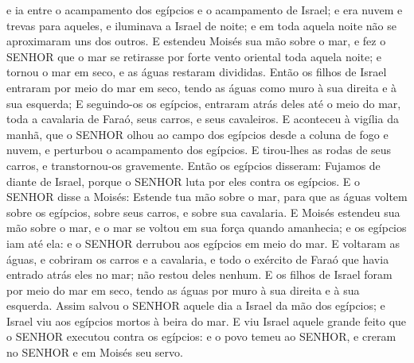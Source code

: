 {e ia entre o acampamento dos egípcios e o acampamento de Israel; e era nuvem e trevas para aqueles, e iluminava a Israel de noite; e em toda aquela noite não se aproximaram uns dos outros.
E estendeu Moisés sua mão sobre o mar, e fez o SENHOR que o mar se retirasse por forte vento oriental toda aquela noite; e tornou o mar em seco, e as águas restaram divididas.
Então os filhos de Israel entraram por meio do mar em seco, tendo as águas como muro à sua direita e à sua esquerda;
E seguindo-os os egípcios, entraram atrás deles até o meio do mar, toda a cavalaria de Faraó, seus carros, e seus cavaleiros.
E aconteceu à vigília da manhã, que o SENHOR olhou ao campo dos egípcios desde a coluna de fogo e nuvem, e perturbou o acampamento dos egípcios.
E tirou-lhes as rodas de seus carros, e transtornou-os gravemente. Então os egípcios disseram: Fujamos de diante de Israel, porque o SENHOR luta por eles contra os egípcios.
E o SENHOR disse a Moisés: Estende tua mão sobre o mar, para que as águas voltem sobre os egípcios, sobre seus carros, e sobre sua cavalaria.
E Moisés estendeu sua mão sobre o mar, e o mar se voltou em sua força quando amanhecia; e os egípcios iam até ela: e o SENHOR derrubou aos egípcios em meio do mar.
E voltaram as águas, e cobriram os carros e a cavalaria, e todo o exército de Faraó que havia entrado atrás eles no mar; não restou deles nenhum.
E os filhos de Israel foram por meio do mar em seco, tendo as águas por muro à sua direita e à sua esquerda.
Assim salvou o SENHOR aquele dia a Israel da mão dos egípcios; e Israel viu aos egípcios mortos à beira do mar.
E viu Israel aquele grande feito que o SENHOR executou contra os egípcios: e o povo temeu ao SENHOR, e creram no SENHOR e em Moisés seu servo.

}
